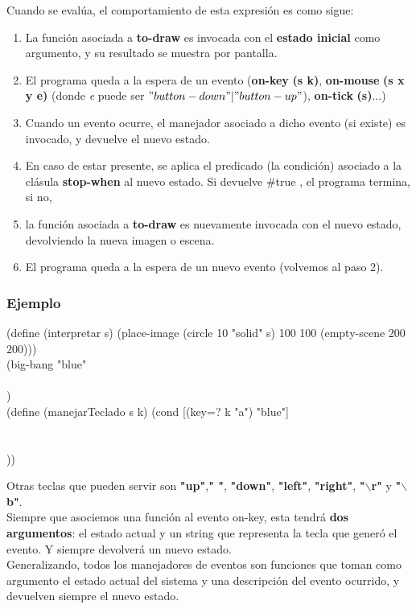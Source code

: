 \documentclass[11pt,a4paper]{article}
\begin{document}
\newpage
\noindent Cuando se evalúa, el comportamiento de esta expresión es como sigue:
\begin{enumerate}
\item La función asociada a \textbf{to-draw} es invocada con el \textbf{estado inicial} como argumento, y su resultado se muestra por pantalla.
\item El programa queda a la espera de un evento (\textbf{on-key} \textbf{(s k)}, \textbf{on-mouse} \textbf{(s x y e)} (donde \textit{e} puede ser $"button-down"|"button-up"$), \textbf{on-tick} \textbf{(s)}...)
\item Cuando un evento ocurre, el manejador asociado a dicho evento (si existe) es invocado, y devuelve el nuevo estado.
\item En caso de estar presente, se aplica el predicado (la condición) asociado a la clásula \textbf{stop-when} al nuevo estado. Si devuelve \#true , el programa termina, si no,
\item la función asociada a \textbf{to-draw} es nuevamente invocada con el nuevo estado, devolviendo la nueva imagen o escena.
\item El programa queda a la espera de un nuevo evento (volvemos al paso 2).
\end{enumerate}

\subsubsection{Ejemplo}
\begin{siderules}
(define (interpretar s) (place-image (circle 10 "solid" s) 100 100 (empty-scene 200 200)))\\

\noindent (big-bang "blue"\\
\indent \indent {}\\
\indent \indent {})\\

\noindent (define (manejarTeclado s k) (cond [(key=? k "a") "blue"]\\
\indent \indent \indent \indent \indent \indent \indent \indent \indent \indent [(key=? k "r") "red"]\\
\indent \indent \indent \indent \indent \indent \indent \indent \indent \indent [(key=? k "v") "green"]\\
\indent \indent \indent \indent \indent \indent \indent \indent \indent \indent [else s]))
\end{siderules}
\noindent Otras teclas que pueden servir son \textbf{"up"},\textbf{" "}, \textbf{"down"}, \textbf{"left"}, \textbf{"right"}, \textbf{"$\backslash$r"} y \textbf{"$\backslash$b"}.\\
\noindent Siempre que asociemos una función al evento on-key, esta tendrá \textbf{dos argumentos}: el estado actual y un string que representa la tecla que generó el evento. Y siempre devolverá un nuevo estado. \\
\noindent Generalizando, todos los manejadores de eventos son funciones que toman como argumento el estado actual del sistema y una descripción del evento ocurrido, y devuelven siempre el nuevo estado.
\end{document}
